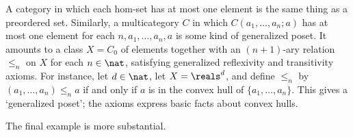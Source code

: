 \begin{example}
A category in which each hom-set has at most one element is the same thing
as a preordered%
%
%
%
%
set.  Similarly, a multicategory $C$ in which $C(a_1,
\ldots, a_n; a)$ has at most one element for each $n, a_1, \ldots, a_n, a$
is some kind of generalized poset.  It amounts to a class $X = C_0$ of
elements together with an $(n+1)$-ary relation $\leq_n$ on $X$
for each $n\in\nat$, satisfying generalized reflexivity and transitivity
axioms.  For instance, let $d\in\nat$, let $X = \reals^d$, and define
$\leq_n$ by $(a_1, \ldots, a_n) \leq_n a$ if and only if $a$ is in the
convex%
%
%
hull of $\{ a_1, \ldots, a_n \}$.  This gives a `generalized poset';
the axioms express basic facts about convex hulls.
\end{example}

The final example is more substantial.

